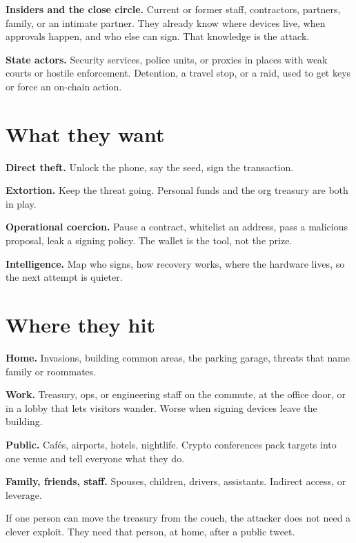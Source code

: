 \textbf{Insiders and the close circle.} Current or former
staff, contractors, partners, family, or an intimate
partner. They already know where devices live, when
approvals happen, and who else can sign. That knowledge
is the attack.

\textbf{State actors.} Security services, police units,
or proxies in places with weak courts or hostile
enforcement. Detention, a travel stop, or a raid, used to
get keys or force an on-chain action.

\section{What they want}

\textbf{Direct theft.} Unlock the phone, say the seed,
sign the transaction.

\textbf{Extortion.} Keep the threat going. Personal funds
and the org treasury are both in play.

\textbf{Operational coercion.} Pause a contract, whitelist
an address, pass a malicious proposal, leak a signing
policy. The wallet is the tool, not the prize.

\textbf{Intelligence.} Map who signs, how recovery works,
where the hardware lives, so the next attempt is quieter.

\section{Where they hit}

\textbf{Home.} Invasions, building common areas, the
parking garage, threats that name family or roommates.

\textbf{Work.} Treasury, ops, or engineering staff on the
commute, at the office door, or in a lobby that lets
visitors wander. Worse when signing devices leave the
building.

\textbf{Public.} Cafés, airports, hotels, nightlife.
Crypto conferences pack targets into one venue and tell
everyone what they do.

\textbf{Family, friends, staff.} Spouses, children,
drivers, assistants. Indirect access, or leverage.

If one person can move the treasury from the couch, the
attacker does not need a clever exploit. They need that
person, at home, after a public tweet.
